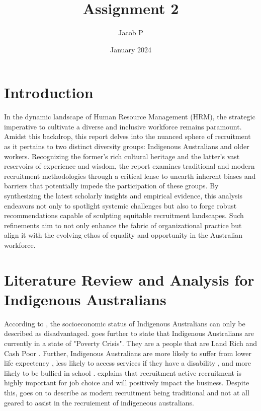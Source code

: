 \documentclass{article}
\title{Assignment 2}
\author{Jacob P }
\date{January 2024}
\begin{document}
\maketitle

\section{Introduction}
In the dynamic landscape of Human Resource Management (HRM), the strategic imperative to cultivate a diverse and inclusive workforce remains paramount. Amidst this backdrop, this report delves into the nuanced sphere of recruitment as it pertains to two distinct diversity groups: Indigenous Australians and older workers. Recognizing the former's rich cultural heritage and the latter's vast reservoirs of experience and wisdom, the report examines traditional and modern recruitment methodologies through a critical lense to unearth inherent biases and barriers that potentially impede the participation of these groups. By synthesizing the latest scholarly insights and empirical evidence, this analysis endeavors not only to spotlight systemic challenges but also to forge robust recommendations capable of sculpting equitable recruitment landscapes. Such refinements aim to not only enhance the fabric of organizational practice but align it with the evolving ethos of equality and opportunity in the Australian workforce.

\section{Literature Review and Analysis for Indigenous Australians}
According to \cite{pearsonExtendingBoundariesHuman2011}, the socioeconomic status of Indigenous Australians can only be described as disadvantaged. \cite{podgerEnduringChallengesNew2017} goes further to state that Indigenous Australians are currently in a state of "Poverty Crisis". They are a people that are Land Rich and Cash Poor \parencite{podgerEnduringChallengesNew2017}. Further, Indigenous Australians are more likely to suffer from lower life expectency \parencite{leederAchievingEquityAustralian2003}, less likely to access services if they have a disability \parencite{statisticsChapterDisability2011}, and more likely to be bullied in school \parencite{coffinBullyingAboriginalContext2010}. \cite{rynesImportanceRecruitmentJob1991} explains that recruitment active recruitment is highly important for job choice and will positively impact the business. Despite this, \cite{pearsonExtendingBoundariesHuman2011} goes on to describe as modern recruitment being traditional and not at all geared to assist in the recruiement of indigeneous australians. 
\end{document}
